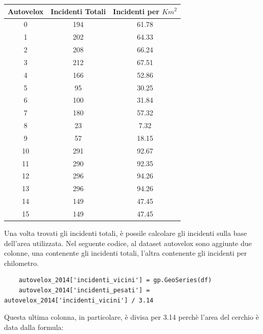 \documentclass[a4paper]{report}
\begin{document}
\begin{center}
    \def\arraystretch{1.5}%
    \begin{tabular}{ |c|c|c| }
        \hline
        Autovelox & Incidenti Totali & Incidenti per $Km^2$ \\ 
        \hline
        \rowcolor{TableGray}
        0    &    194   &      61.78\\
        1    &    202   &      64.33\\
        \rowcolor{TableGray}
        2    &    208   &      66.24\\
        3    &    212   &      67.51\\
        \rowcolor{TableGray}
        4    &    166   &      52.86\\
        5    &     95   &      30.25\\
        \rowcolor{TableGray}
        6    &    100   &      31.84\\
        7    &    180   &      57.32\\
        \rowcolor{TableGray}
        8    &     23   &       7.32\\
        9    &     57   &      18.15\\
        \rowcolor{TableGray}
        10   &    291   &      92.67\\
        11   &    290   &      92.35\\
        \rowcolor{TableGray}
        12   &    296   &      94.26\\
        13   &    296   &      94.26\\
        \rowcolor{TableGray}
        14   &    149   &      47.45\\
        15   &    149   &      47.45\\
        \hline
    \end{tabular}
\end{center}

Una volta trovati gli incidenti totali, è possile calcolare gli incidenti sulla base dell'area utilizzata.
Nel seguente codice, al dataset autovelox sono aggiunte due colonne, una contenente gli incidenti totali, 
l'altra contenente gli incidenti per chilometro.

\begin{lstlisting}
    autovelox_2014['incidenti_vicini'] = gp.GeoSeries(df)
    autovelox_2014['incidenti_pesati'] = autovelox_2014['incidenti_vicini'] / 3.14
\end{lstlisting}

Questa ultima colonna, in particolare, è divisa per 3.14 perchè l'area del cerchio è data dalla formula: 
\end{document}

